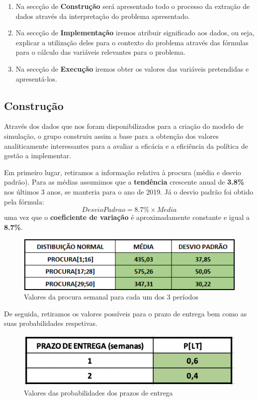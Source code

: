 \documentclass[a4paper]{article}
\begin{document}
\begin{enumerate}
	\item Na seccção de \textbf{Construção} será apresentado todo o processo da extração de dados através da interpretação do problema apresentado.
	\item Na seccção de \textbf{Implementação} iremos atribuir significado aos dados, ou seja, explicar a utilização deles para o contexto do problema através das fórmulas para o cálculo das variáveis relevantes para o problema.
	\item Na seccção de \textbf{Execução} iremos obter os valores das variáveis pretendidas e apresentá-los.
\end{enumerate}

\newpage

\subsection{Construção}

Através dos dados que nos foram disponibilizados para a criação do modelo de simulação, o grupo construiu assim a base para a obtenção dos valores analiticamente interessantes para a avaliar a eficácia e a eficiência da política de gestão a implementar.

Em primeiro lugar, retiramos a informação relativa à procura (média e desvio padrão). Para as médias assumimos que a \textbf{tendência} crescente anual de \textbf{3.8\%} nos últimos 3 anos, se manteria para o ano de 2019. Já o desvio padrão foi obtido pela fórmula:  			$$ Desvio Padrao = 8.7\% \times Media $$
uma vez que o \textbf{coeficiente de variação} é aproximadamente constante e igual a \textbf{8.7\%}.

\begin{figure}[H]
\centering
\includegraphics[scale=0.7]{distribuicao.png}
\caption{Valores da procura semanal para cada um dos 3 períodos}
\label{img:procura}
\end{figure}

De seguida, retiramos os valores possíveis para o prazo de entrega bem como as suas probabilidades respetivas.

\begin{figure}[H]
\centering
\includegraphics[scale=0.7]{prazo.png}
\caption{Valores das probabilidades dos prazos de entrega }
\label{img:prazo}
\end{figure}
\end{document}

